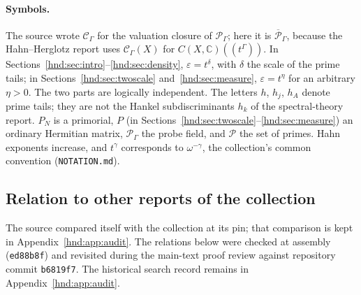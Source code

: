 \documentclass[11pt,oneside]{article}
\theoremstyle{definition}
\theoremstyle{remark}
\newcommand{\C}{\mathbb C}
\newcommand{\Pfield}{\mathscr P_\Gamma}
\newcommand{\eps}{\varepsilon}
\newcommand{\primes}{\mathcal P}
\newcommand{\repo}[1]{\nolinkurl{#1}}%
\begin{document}
\paragraph{Symbols.} The source wrote $\mathscr C_\Gamma$ for the valuation
closure of $\Pfield$; here it is $\overline{\mathscr P}_\Gamma$, because
the Hahn--Herglotz report uses $\mathscr C_\Gamma(X)$ for
$C(X,\C)((t^\Gamma))$. In Sections~\ref{hnd:sec:intro}--\ref{hnd:sec:density},
$\eps=t^\delta$, with $\delta$ the scale of the prime tails; in
Sections~\ref{hnd:sec:twoscale} and~\ref{hnd:sec:measure},
$\eps=t^\eta$ for an arbitrary $\eta>0$. The two parts are logically
independent. The letters $h$, $h_j$, $h_A$ denote prime tails; they are not
the Hankel subdiscriminants $h_k$ of the spectral-theory report. $P_N$ is a
primorial, $P$ (in Sections~\ref{hnd:sec:twoscale}--\ref{hnd:sec:measure})
an ordinary Hermitian matrix, $\Pfield$ the probe field, and $\primes$ the
set of primes. Hahn exponents increase, and $t^\gamma$ corresponds to
$\omega^{-\gamma}$, the collection's common convention (\repo{NOTATION.md}).

\subsection{Relation to other reports of the collection}\label{hnd:sec:position}

The source compared itself with the collection at its pin; that comparison
is kept in Appendix~\ref{hnd:app:audit}. The relations below were checked
at assembly (\texttt{ed88b8f}) and revisited during the main-text proof
review against repository commit \texttt{b6819f7}. The historical search record remains
in Appendix~\ref{hnd:app:audit}.
\end{document}
